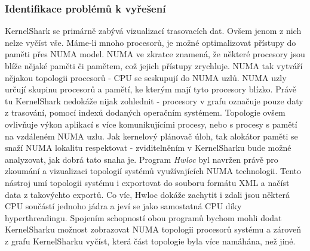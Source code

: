 \subsubsection*{Identifikace problémů k vyřešení}
KernelShark se primárně zabývá vizualizací trasovacích dat. Ovšem jenom z nich nelze vyčíst vše. Máme-li mnoho procesorů, je možné optimalizovat přístupy do paměti přes NUMA model. NUMA ve zkratce znamená, že některé procesory jsou blíže nějaké paměti či pamětem, což jejich přístupy zrychluje. NUMA tak vytváří nějakou topologii procesorů - CPU se seskupují do NUMA uzlů. NUMA uzly určují skupinu procesorů a pamětí, ke kterým mají tyto procesory blízko. Právě tu KernelShark nedokáže nijak zohlednit - procesory v grafu označuje pouze daty z trasování, pomocí indexů dodaných operačním systémem. Topologie ovšem ovlivňuje výkon aplikací s více komunikujícími procesy, nebo s procesy s pamětí na vzdáleném NUMA uzlu. Jak kernelový plánovač úloh, tak alokátor paměti se snaží NUMA lokalitu respektovat - zviditelněním  v KernelSharku bude možné analyzovat, jak dobrá tato snaha je. Program \emph{Hwloc} byl navržen právě pro zkoumání a vizualizaci topologií systémů využívajících NUMA technologii. Tento nástroj umí topologii systému i exportovat do souboru formátu XML a načíst data z takovýchto exportů. Co víc, Hwloc dokáže zachytit i zdali jsou některá CPU součástí jednoho jádra a jeví se jako samostatná CPU díky hyperthreadingu. Spojením schopností obou programů bychom mohli dodat KernelSharku možnost zobrazovat NUMA topologii procesorů systému a zároveň z grafu KernelSharku vyčíst, která část topologie byla více namáhána, než jiné.  

